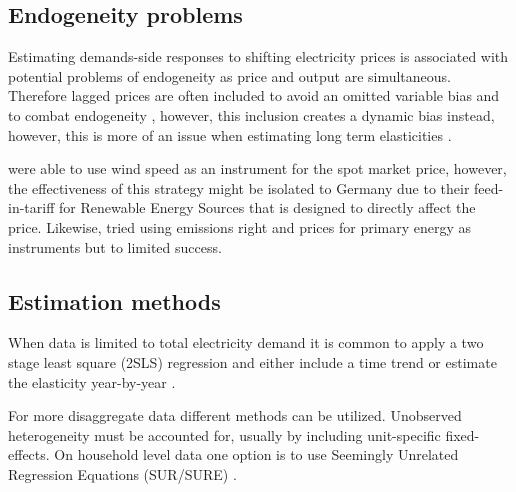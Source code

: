 \subsection{Endogeneity problems}
\label{subsec:b_endogeneity}
Estimating demands-side responses to shifting electricity prices is associated with potential problems of endogeneity as price and output are simultaneous. Therefore lagged prices are often included to avoid an omitted variable bias and to combat endogeneity \citep{lijesen2007real}, however, this inclusion creates a dynamic bias instead, however, this is more of an issue when estimating long term elasticities \citep{okajima2013estimation}. %
\par
\citet{bonte2015price} were able to use wind speed as an instrument for the spot market price, however, the effectiveness of this strategy might be isolated to Germany due to their feed-in-tariff for Renewable Energy Sources that is designed to directly affect the price. Likewise, \citet{graf2013measuring} tried using emissions right and prices for primary energy as instruments but to limited success.

\subsection{Estimation methods}
\label{subsec:b_estimation}
When data is limited to total electricity demand it is common to apply a two stage least square (2SLS) regression and either include a time trend \citep{lijesen2007real} or estimate the elasticity year-by-year \citep{bonte2015price}.
\par
For more disaggregate data different methods can be utilized. Unobserved heterogeneity must be accounted for, usually by including unit-specific fixed-effects. On household level data one option is to use Seemingly Unrelated Regression Equations (SUR/SURE) \citep{vesterberg2014residential}.


